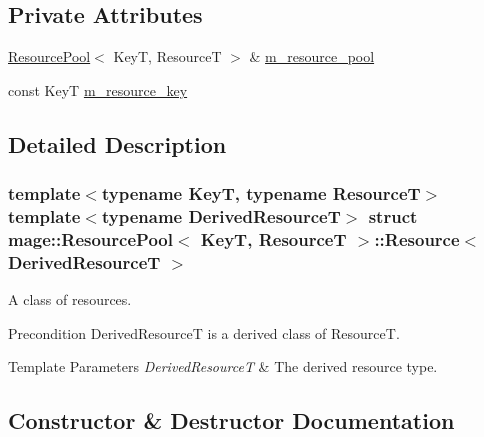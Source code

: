 \subsection*{Private Attributes}
\begin{DoxyCompactItemize}
\item 
\hyperlink{classmage_1_1_resource_pool}{Resource\+Pool}$<$ KeyT, ResourceT $>$ \& \hyperlink{structmage_1_1_resource_pool_1_1_resource_ab3810b406a481301673b74670b4cc92f}{m\+\_\+resource\+\_\+pool}
\item 
const KeyT \hyperlink{structmage_1_1_resource_pool_1_1_resource_a7980e0160d7b3ff4fc70ec4deabb443c}{m\+\_\+resource\+\_\+key}
\end{DoxyCompactItemize}


\subsection{Detailed Description}
\subsubsection*{template$<$typename KeyT, typename ResourceT$>$\newline
template$<$typename Derived\+ResourceT$>$\newline
struct mage\+::\+Resource\+Pool$<$ Key\+T, Resource\+T $>$\+::\+Resource$<$ Derived\+Resource\+T $>$}

A class of resources.

\begin{DoxyPrecond}{Precondition}
{\ttfamily Derived\+ResourceT} is a derived class of {\ttfamily ResourceT}. 
\end{DoxyPrecond}

\begin{DoxyTemplParams}{Template Parameters}
{\em Derived\+ResourceT} & The derived resource type. \\
\hline
\end{DoxyTemplParams}


\subsection{Constructor \& Destructor Documentation}
\hypertarget{structmage_1_1_resource_pool_1_1_resource_aac2dcc5cb5b92a9126b270e62a7585cb}{}\label{structmage_1_1_resource_pool_1_1_resource_aac2dcc5cb5b92a9126b270e62a7585cb} 
